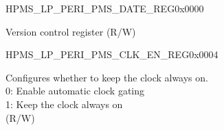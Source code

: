\begin{register}{H}{PMS\_LP\_PERI\_PMS\_DATE\_REG}{0x0000}\label{regdesc:PMSLPPERIPMSDATEREG}
%
\regnewline%
\begin{regdesc}\begin{reglist}
\label{fielddesc:PMSLPPERIPMSDATE}\item [PMS\_LP\_PERI\_PMS\_DATE] Version control register (R/W)
\end{reglist}\end{regdesc}
\end{register}


\begin{register}{H}{PMS\_LP\_PERI\_PMS\_CLK\_EN\_REG}{0x0004}\label{regdesc:PMSLPPERIPMSCLKENREG}
%
%
\regnewline%
\begin{regdesc}\begin{reglist}
\label{fielddesc:PMSLPPERIPMSCLKEN}\item [PMS\_LP\_PERI\_PMS\_CLK\_EN] Configures whether to keep the clock always on.\\
0: Enable automatic clock gating \\
1: Keep the clock always on\\ (R/W)
\end{reglist}\end{regdesc}
\end{register}


